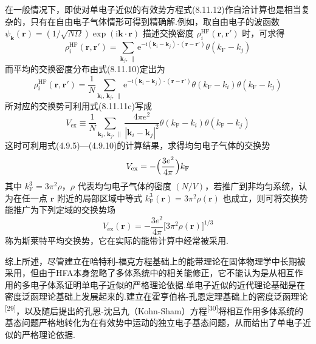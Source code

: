 在一般情况下，即使对单电子近似的有效势方程式(8.11.12)作自洽计算也是相当复杂的，只有在自由电子气体情形可得到精确解.例如，取自由电子的波函数 $\psi_{\boldsymbol{k}}(\boldsymbol{r})=(1/\sqrt{N\Omega})\exp(\mathrm{i}\boldsymbol{k}\cdot\boldsymbol{r})$ 描述交换密度 $\rho_{i}^{\mathrm{HF}}(\boldsymbol{r},\boldsymbol{r}')$ 时，可求得
\begin{equation}
  \rho_{i}^{\mathrm{HF}}(\boldsymbol{r},\boldsymbol{r}')
  =\sum_{\boldsymbol{k}_{j},\,\parallel}
  \mathrm{e}^{-\mathrm{i}(\boldsymbol{k}_{i}-\boldsymbol{k}_{j})\cdot(\boldsymbol{r}-\boldsymbol{r}')}
  \theta(k_{\mathrm{F}}-k_{j})
\end{equation}
而平均的交换密度分布由式(8.11.10)定出为
\begin{equation}
  \rho_{i}^{\mathrm{HF}}(\boldsymbol{r},\boldsymbol{r}')
  =\frac{1}{N}\sum_{\boldsymbol{k}_{i},\,\boldsymbol{k}_{j},\,\parallel}
  \mathrm{e}^{-\mathrm{i}(\boldsymbol{k}_{i}-\boldsymbol{k}_{j})\cdot(\boldsymbol{r}-\boldsymbol{r}')}
  \theta(k_{\mathrm{F}}-k_{i})\theta(k_{\mathrm{F}}-k_{j})
\end{equation}
所对应的交换势可利用式(8.11.11c)写成
\begin{equation}
  V_{\mathrm{ex}}\equiv\frac{1}{N}\sum_{\boldsymbol{k}_{i},\,\boldsymbol{k}_{j},\,\parallel}
  \frac{4\pi e^{2}}{|\boldsymbol{k}_{i}-\boldsymbol{k}_{j}|^{2}}
  \theta(k_{\mathrm{F}}-k_{i})\theta(k_{\mathrm{F}}-k_{j})
\end{equation}
这时可利用式(4.9.5)—(4.9.10)的计算结果，求得均匀电子气体的交换势
\begin{equation}
  V_{\mathrm{ex}}=-\Bigl(\frac{3e^{2}}{4\pi}\Bigr)k_{\mathrm{F}}
\end{equation}
其中 $k_{\mathrm{F}}^{3}=3\pi^{2}\rho$，$\rho$ 代表均匀电子气体的密度 $(N/V)$，若推广到非均匀系统，认为在任一点 $\boldsymbol{r}$ 附近的局部区域中等式 $k_{\mathrm{F}}^{3}(\boldsymbol{r})=3\pi^{2}\rho(\boldsymbol{r})$ 也成立，则可将交换势能推广为下列定域的交换势场
\begin{equation}
  V_{\mathrm{ex}}(\boldsymbol{r})=-\frac{3e^{2}}{4\pi}\bigl[3\pi^{2}\rho(\boldsymbol{r})\bigr]^{1/3}
\end{equation}
称为斯莱特平均交换势，它在实际的能带计算中经常被采用.

综上所述，尽管建立在哈特利-福克方程基础上的能带理论在固体物理学中长期被采用，但由于HFA本身忽略了多体系统中的相关能修正，它不能认为是从相互作用的多电子体系证明单电子近似的严格理论依据.单电子近似的近代理论基础是在密度泛函理论基础上发展起来的.建立在霍亨伯格-孔恩定理基础上的密度泛函理论\textsuperscript{[29]}，以及随后提出的孔恩-沈吕九（Kohn-Sham）方程\textsuperscript{[30]}将相互作用多体系统的基态问题严格地转化为在有效势中运动的独立电子基态问题，从而给出了单电子近似的严格理论依据.
